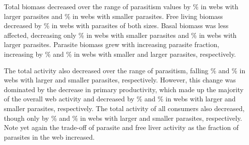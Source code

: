 \documentclass[/home/nkappler/Research/Dissertation/dissertation.tex]{subfiles}
\begin{document}
\begin{bibunit}
\smallParaTab \edef\smallMeanBioPara{\pgfplotsretval}

\pgfmathparse{\bigMeanBioPara/\smallMeanBioPara}
\edef\bigSmallParaRatio{\pgfmathresult}

\edef\smallFreeBigParaParaBio{\bigMeanBioPara}
\edef\smallFreeSmallParaParaBio{\smallMeanBioPara}


\bigParaTab \edef\bigPerParaI{\pgfplotsretval}
 \edef\bigPerParaI{\pgfmathresult}

\smallParaTab \edef\smallPerParaI{\pgfplotsretval}
 \edef\smallPerParaI{\pgfmathresult}




Total biomass decreased over the range of parasitism values by
\% in webs with larger
parasites and \% in webs
with smaller parasites. Free living biomass decreased by
\% in webs 
with parasites of both sizes.
Basal biomass was less affected, decreasing only
\% in webs with smaller
parasites and \% in webs
with larger parasites. Parasite biomass grew with increasing parasite fraction,
increasing by \% and
\% in webs with smaller and
larger parasites, respectively.

The total activity also decreased over the range of parasitism, falling
\% and
\% in webs with larger and
smaller parasites, respectively. However, this change was dominated by the
decrease in primary productivity, which made up the majority of the overall web
activity and decreased by
\% and
\% in webs with larger
and smaller parasites, respectively. The total activity of all consumers also
decreased, though only by \%
and \% in webs with larger
and smaller parasites, respectively. Note yet again the trade-off of parasite
and free liver activity as the fraction of parasites in the web increased.


\end{bibunit}
\end{document}

